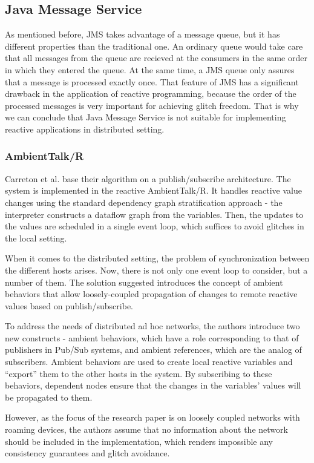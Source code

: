 \documentclass{sigplanconf}
\begin{document}
\subsection*{Java Message Service}

As mentioned before, JMS takes advantage of a message queue, but it has different properties than the traditional one. An ordinary queue would take care that all messages from the queue are recieved at the consumers in the same order in which they entered the queue. At the same time, a JMS queue only assures that a message is processed exactly once. That feature of JMS has a significant drawback in the application of reactive programming, because the order of the processed messages  is very important for achieving glitch freedom. That is why we can conclude that Java Message Service is not suitable for implementing reactive applications in distributed setting.

\subsubsection{AmbientTalk/R}
Carreton et al. \cite{loosely} base their algorithm on a publish/subscribe architecture. The system is implemented in the reactive AmbientTalk/R. It handles reactive value changes using the standard dependency graph stratification approach - the interpreter constructs a dataflow graph from the variables. Then, the updates to the values are scheduled in a single event loop, which suffices to avoid glitches in the local setting. 

When it comes to the distributed setting, the problem of synchronization between the different hosts arises. Now, there is not only one event loop to consider, but a number of them. The solution suggested introduces the concept of ambient behaviors that allow loosely-coupled propagation of changes to remote reactive values based on publish/subscribe. 

To address the needs of distributed ad hoc networks, the authors introduce two new constructs - ambient behaviors, which have a role corresponding to that of publishers in Pub/Sub systems, and ambient references, which are the analog of subscribers. Ambient behaviors are used to create local reactive variables and ``export'' them to the other hosts in the system. By subscribing to these behaviors, dependent nodes ensure that the changes in the variables' values will be propagated to them.

However, as the focus of the research paper is on loosely coupled networks with roaming devices, the authors assume that no information about the network should be included in the implementation, which renders impossible any consistency guarantees and glitch avoidance.
\end{document}
